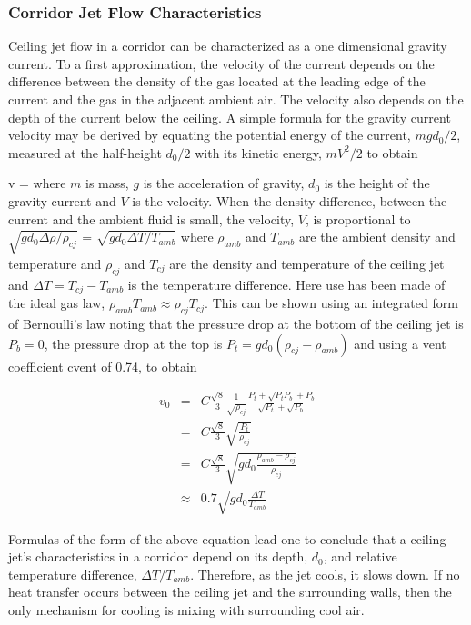 \subsubsection{Corridor Jet Flow Characteristics}

Ceiling jet flow in a corridor can be characterized as a one dimensional gravity current. To a first approximation, the velocity of the current depends on the difference between the density of the gas located at the leading edge of the current and the gas in the adjacent ambient air.  The velocity also depends on the depth of the current below the ceiling. A simple formula for the gravity current velocity may be derived by equating the potential energy of the current, $mgd_0/2$, measured at the half-height $d_0/2$ with its kinetic energy, $mV^2/2$ to obtain

\be v =  \ee
where $m$ is mass, $g$ is the acceleration of gravity, $d_0$ is the height of the gravity current and $V$ is the velocity. When the density difference, between the current and the ambient fluid is small, the velocity, $V$, is proportional to $\sqrt{g d_0 \Delta \rho / \rho_{cj}}$ = $\sqrt{g d_0 \Delta T / T_{amb}}$ where $\rho_{amb}$ and $T_{amb}$ are the ambient density and temperature and $\rho_{cj}$ and $T_{cj}$ are the density and temperature of the ceiling jet and  $\Delta T = T_{cj} - T_{amb}$ is the temperature difference. Here use has been made of the ideal gas law, $\rho_{amb} T_{amb} \approx \rho_{cj} T_{cj}$.  This can be shown using an integrated form of Bernoulli's law noting that the pressure drop at the bottom of the ceiling jet is $P_b = 0$, the pressure drop at the top is $P_t = gd_0(\rho_{cj} - \rho_{amb})$ and using a vent coefficient cvent of 0.74, to obtain

\begin{eqnarray}
v_0 & = & C \frac{\sqrt{8}}{3} \frac{1}{\sqrt{\rho_{cj}}} \frac{P_t + \sqrt{P_tP_b}+P_b}{\sqrt{P_t} + \sqrt{P_b}} \nonumber \\
 & = & C \frac{\sqrt{8}}{3} \sqrt{\frac{P_t}{\rho_{cj}}} \nonumber \\
 & = & C \frac{\sqrt{8}}{3} \sqrt{g d_0 \frac{\rho_{amb} - \rho_{cj}}{\rho_{cj}}} \nonumber \\
 & \approx & 0.7 \sqrt{g d_0 \frac{\Delta T}{T_{amb}}} \label{eq:Corridor_Flow}
 \end{eqnarray}

Formulas of the form of the above equation lead one to conclude that a ceiling jet's characteristics in a corridor depend on its depth, $d_0$, and relative temperature difference, $\Delta T/T_{amb}$. Therefore, as the jet cools, it slows down. If no heat transfer occurs between the ceiling jet and the surrounding walls, then the only mechanism for cooling is mixing with surrounding cool air.

